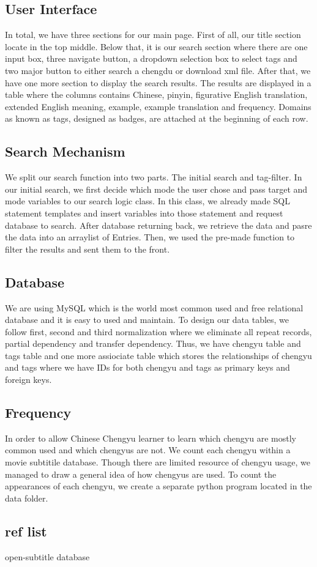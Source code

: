 \documentclass[11pt]{article} %
\begin{document}
\subsection{User Interface}
\indent In total, we have three sections for our main page. First of all, our title section locate in the top middle. Below that, it is our search section where there are one input box, three navigate button, a dropdown selection box to select tags and two major button to either search a chengdu or download xml file. After that, we have one more section to display the search results. The results are displayed in a table where the columns contains Chinese, pinyin, figurative English translation, extended English meaning, example, example translation and frequency. Domains as known as tags, designed as badges, are attached at the beginning of each row.

\subsection{Search Mechanism}
\indent We split our search function into two parts. The initial search and tag-filter. In our initial search, we first decide which mode the user chose and pass target and mode variables to our search logic class. In this class, we already made SQL statement templates and insert variables into those statement and request database to search. After database returning back, we retrieve the data and pasre the data into an arraylist of Entries. Then, we used the pre-made function to filter the results and sent them to the front.

\subsection{Database}
\indent We are using MySQL which is the world most common used and free relational database and it is easy to used and maintain. To design our data tables, we follow first, second and third normalization where we eliminate all repeat records, partial dependency and transfer dependency. Thus, we have chengyu table and tags table and one more assiociate table which stores the relationships of chengyu and tags where we have IDs for both chengyu and tags as primary keys and foreign keys.

\subsection{Frequency}
\indent In order to allow Chinese Chengyu learner to learn which chengyu are mostly common used and which chengyus are not. We count each chengyu within a movie subtitile database. Though there are limited resource of chengyu usage, we managed to draw a general idea of how chengyus are used. To count the appearances of each chengyu, we create a separate python program located in the data folder.

\subsection{ref list}
\indent open-subtitle database



\end{document}
